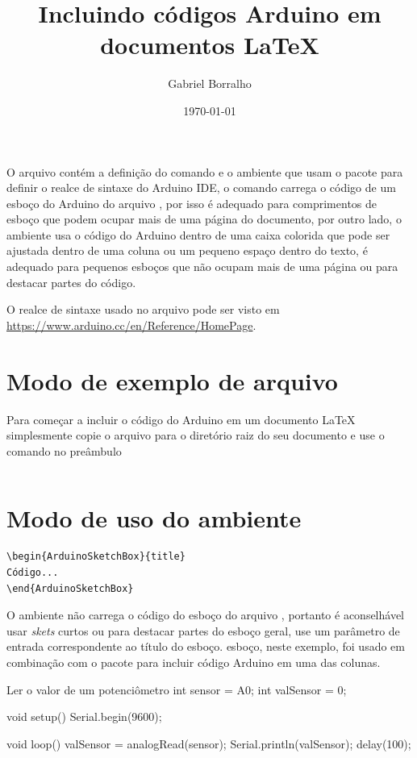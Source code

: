 \documentclass{article}
\title{Incluindo códigos Arduino em documentos \LaTeX{}}
\author{Gabriel Borralho}
\date{\today}
\begin{document}
\maketitle

O arquivo  contém a definição do comando  e o ambiente \linebreak {} que usam o pacote  para definir o realce de sintaxe do Arduino IDE, o comando  carrega o código de um esboço do Arduino do arquivo , por isso é adequado para comprimentos de esboço que podem ocupar mais de uma página do documento, por outro lado, o ambiente  usa o código do Arduino dentro de uma caixa colorida que pode ser ajustada dentro de uma coluna ou um pequeno espaço dentro do texto, é adequado para pequenos esboços que não ocupam mais de uma página ou para destacar partes do código.

O realce de sintaxe usado no arquivo  pode ser visto em \url{https://www.arduino.cc/en/Reference/HomePage}.

\section{Modo de exemplo de arquivo }

Para começar a incluir o código do Arduino em um documento \LaTeX{} simplesmente copie o arquivo  para o diretório raiz do seu documento e use o comando  no preâmbulo


\begin{verbatim}

\end{verbatim}

\section{Modo de uso do ambiente }

\begin{verbatim}
\begin{ArduinoSketchBox}{title}
Código...
\end{ArduinoSketchBox}
\end{verbatim}

\begin{paracol}{2}
O ambiente  não carrega o código do esboço do arquivo , portanto é aconselhável usar \textit{skets} curtos ou para destacar partes do esboço geral, use um parâmetro de entrada correspondente ao título do esboço. esboço, neste exemplo, foi usado em combinação com o pacote  para incluir código Arduino em uma das colunas.
\switchcolumn
\begin{ArduinoSketchBox}{Ler o valor de um potenciômetro}
int sensor = A0;
int valSensor = 0;

void setup(){
	Serial.begin(9600);
}

void loop(){
	valSensor = analogRead(sensor);
    Serial.println(valSensor);
    delay(100);
}
\end{ArduinoSketchBox}
\end{paracol}
\end{document}
